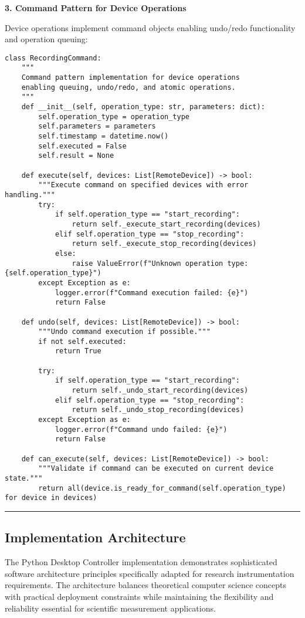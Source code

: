 \documentclass[11pt,a4paper]{article}
\begin{document}
\textbf{3. Command Pattern for Device Operations}

Device operations implement command objects enabling undo/redo functionality and operation queuing:

\begin{verbatim}
class RecordingCommand:
    """
    Command pattern implementation for device operations
    enabling queuing, undo/redo, and atomic operations.
    """
    def __init__(self, operation_type: str, parameters: dict):
        self.operation_type = operation_type
        self.parameters = parameters
        self.timestamp = datetime.now()
        self.executed = False
        self.result = None

    def execute(self, devices: List[RemoteDevice]) -> bool:
        """Execute command on specified devices with error handling."""
        try:
            if self.operation_type == "start_recording":
                return self._execute_start_recording(devices)
            elif self.operation_type == "stop_recording":
                return self._execute_stop_recording(devices)
            else:
                raise ValueError(f"Unknown operation type: {self.operation_type}")
        except Exception as e:
            logger.error(f"Command execution failed: {e}")
            return False

    def undo(self, devices: List[RemoteDevice]) -> bool:
        """Undo command execution if possible."""
        if not self.executed:
            return True

        try:
            if self.operation_type == "start_recording":
                return self._undo_start_recording(devices)
            elif self.operation_type == "stop_recording":
                return self._undo_stop_recording(devices)
        except Exception as e:
            logger.error(f"Command undo failed: {e}")
            return False

    def can_execute(self, devices: List[RemoteDevice]) -> bool:
        """Validate if command can be executed on current device state."""
        return all(device.is_ready_for_command(self.operation_type) for device in devices)
\end{verbatim}

\hrule

\subsection{Implementation Architecture}

The Python Desktop Controller implementation demonstrates sophisticated software architecture principles specifically
adapted for research instrumentation requirements. The architecture balances theoretical computer science concepts with
practical deployment constraints while maintaining the flexibility and reliability essential for scientific measurement
applications.
\end{document}
